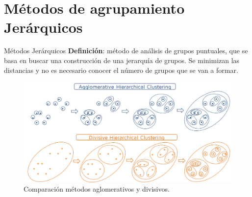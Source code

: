 \documentclass[spanish]{beamer}
\begin{document}
\section{Métodos de agrupamiento\\ Jerárquicos}
\begin{frame}{Métodos Jerárquicos}
	\centering
	\textbf{Definición}: método de análisis de grupos puntuales, que se basa en buscar una construcción de una jerarquía de grupos. Se minimizan las distancias y no es necesario conocer el número de grupos que se van a formar.\\
	\begin{figure}[H]
		\centering
		\includegraphics[scale=0.15]{victoria/compAglomeDivisivo}
		\caption{Comparación métodos aglomerativos y divisivos.}
		\label{fig:agl_div}
	\end{figure}
\end{frame}
\end{document}
